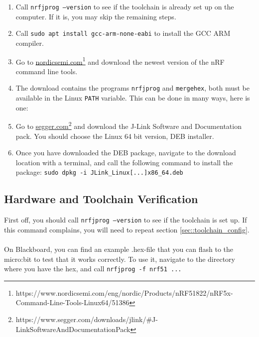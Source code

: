 \documentclass[11pt,a4paper]{article}
\begin{document}
\begin{enumerate}
\item Call \texttt{nrfjprog --version} to see if the toolchain is already set up on the computer. If it is, you may skip the remaining steps.
\item Call \texttt{sudo apt install gcc-arm-none-eabi} to install the GCC ARM compiler.
\item Go to \href{https://www.nordicsemi.com/eng/nordic/Products/nRF51822/nRF5x-Command-Line-Tools-Linux64/51386}{nordicsemi.com}\footnote{https://www.nordicsemi.com/eng/nordic/Products/nRF51822/nRF5x-Command-Line-Tools-Linux64/51386} and download the newest version of the nRF command line tools.
\item The download contains the programs \texttt{nrfjprog} and \texttt{mergehex}, both must be available in the Linux \texttt{PATH} variable. This can be done in many ways, here is one:
\item Go to \href{https://www.segger.com/downloads/jlink/\#J-LinkSoftwareAndDocumentationPack}{segger.com}\footnote{https://www.segger.com/downloads/jlink/\#J-LinkSoftwareAndDocumentationPack} and download the J-Link Software and Documentation pack. You should choose the Linux 64 bit version, DEB installer.
\item Once you have downloaded the DEB package, navigate to the download location with a terminal, and call the following command to install the package: \texttt{sudo dpkg -i JLink_Linux[...]x86_64.deb}
\end{enumerate}

\subsection{Hardware and Toolchain Verification}
First off, you should call \texttt{nrfjprog --version} to see if the toolchain is set up. If this command complains, you will need to repeat section \ref{sec::toolchain_config}.\\
\\
On Blackboard, you can find an example .hex-file that you can flash to the micro:bit to test that it works correctly. To use it, navigate to the directory where you have the hex, and call \texttt{nrfjprog -f nrf51 ...} 


\setcounter{section}{0}
\renewcommand{\thesection}{\arabic{section}}
\renewcommand{\thesubsection}{\arabic{section}.\arabic{subsection}}
\end{document}
